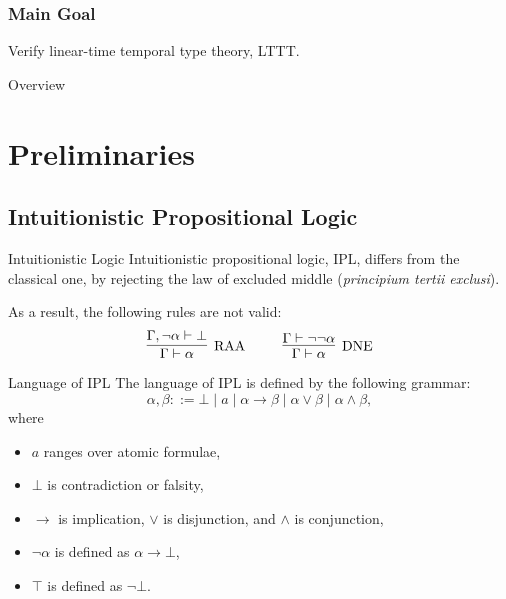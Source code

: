 \begin{frame}[t,plain]
\titlepage
\end{frame}

\renewcommand{\colon}{\mbox{~:~}}

\newcommand{\ang}[1]{\left\langle #1 \right\rangle}
\newcommand{\ceil}[1]{\left\lceil #1 \right\rceil}
\newcommand{\floor}[1]{\left\lfloor #1 \right\rfloor}
\renewcommand{\diamond}{\lozenge}
\newcommand{\T}{\mathfrak{T}}
\newcommand{\A}{\mathfrak{A}}
\renewcommand{\t}{\mathfrak{t}}
\newcommand{\e}{\mathfrak{e}}
\renewcommand{\v}{\mathfrak{v}}
\newcommand{\n}{\mathfrak{n}}

\begin{frame}[fragile]
    \frametitle{Main Goal}
  
    Verify linear-time temporal type theory, LTTT.
\end{frame}

\begin{frame}{Overview}
\tableofcontents
\end{frame}

\section{Preliminaries}

\subsection{Intuitionistic Propositional Logic}

\begin{frame}{Intuitionistic Logic}
    Intuitionistic propositional logic, IPL, differs from the classical one, by rejecting the law of excluded middle (\textit{principium tertii exclusi}).
    
    As a result, the following rules are not valid:
    \[
    \infer[\mbox{RAA}]{\Gamma \vdash \alpha}{\Gamma, \neg\alpha \vdash \bot}
    ~~~~ ~~~~
    \infer[\mbox{DNE}]{\Gamma \vdash \alpha}{\Gamma \vdash \neg\neg\alpha}
    \]
\end{frame}

\begin{frame}{Language of IPL}
    The language of IPL is defined by the following grammar:
    \[
    \alpha, \beta ::= \bot \mid a \mid \alpha \rightarrow \beta \mid \alpha \vee \beta \mid \alpha \wedge \beta,
    \]
    where
    \begin{itemize}
        \item $a$ ranges over atomic formulae,
        \item $\bot$ is contradiction or falsity,
        \item $\rightarrow$ is implication, $\vee$ is disjunction, and $\wedge$ is conjunction,
        \item $\neg\alpha$ is defined as $\alpha \rightarrow \bot$,
        \item $\top$ is defined as $\neg\bot$.
    \end{itemize}
\end{frame}

